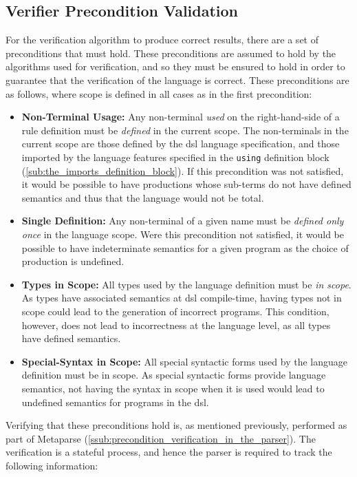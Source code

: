 \subsection{Verifier Precondition Validation} %
\label{sub:verifier_precondition_validation}
For the verification algorithm to produce correct results, there are a set of preconditions that must hold. 
These preconditions are assumed to hold by the algorithms used for verification, and so they must be ensured to hold in order to guarantee that the verification of the language is correct.
These preconditions are as follows, where scope is defined in all cases as in the first precondition:
\begin{itemize}
    \item \label{item:non_terminal_usage} \textbf{Non-Terminal Usage:} Any non-terminal \textit{used} on the right-hand-side of a rule definition must be \textit{defined} in the current scope. 
    The non-terminals in the current scope are those defined by the \gls{dsl} language specification, and those imported by the language features specified in the \texttt{using} definition block (\autoref{sub:the_imports_definition_block}).
    If this precondition was not satisfied, it would be possible to have productions whose sub-terms do not have defined semantics and thus that the language would not be total. 
    \item \textbf{Single Definition:} Any non-terminal of a given name must be \textit{defined only once} in the language scope.
    Were this precondition not satisfied, it would be possible to have indeterminate semantics for a given program as the choice of production is undefined.
    \item \textbf{Types in Scope:} All types used by the language definition must be \textit{in scope}.
    As types have associated semantics at \gls{dsl} compile-time, having types not in scope could lead to the generation of incorrect programs. 
    This condition, however, does not lead to incorrectness at the language level, as all types have defined semantics.
    \item \textbf{Special-Syntax in Scope:} All special syntactic forms used by the language definition must be in scope.
    As special syntactic forms provide language semantics, not having the syntax in scope when it is used would lead to undefined semantics for programs in the \gls{dsl}. 
\end{itemize}

Verifying that these preconditions hold is, as mentioned previously, performed as part of Metaparse (\autoref{ssub:precondition_verification_in_the_parser}).
The verification is a stateful process, and hence the parser is required to track the following information:

